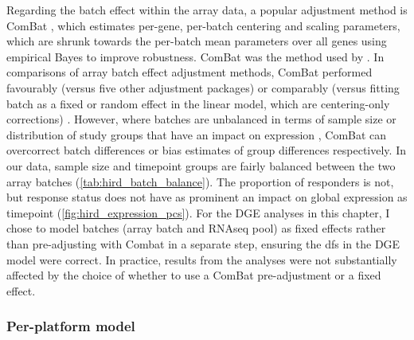 Regarding the batch effect within the array data, a popular adjustment method is ComBat \autocite{johnson2007AdjustingBatchEffects}, which estimates per-gene, per-batch centering and scaling parameters, which are shrunk towards the per-batch mean parameters over all genes using empirical Bayes to improve robustness.
ComBat was the method used by \textcite{sobolev2016AdjuvantedInfluenzaH1N1Vaccination}.
In comparisons of array batch effect adjustment methods, ComBat performed favourably (versus five other adjustment packages) \autocite{chen2011RemovingBatchEffects} or comparably (versus fitting batch as a fixed or random effect in the linear model, which are centering-only corrections) \autocite{espin-perez2018ComparisonStatisticalMethods}.
However, where batches are unbalanced in terms of sample size \autocite{zhang2018AlternativeEmpiricalBayes} or distribution of study groups that have an impact on expression \autocite{nygaard2015MethodsThatRemove}, ComBat can overcorrect batch differences or bias estimates of group differences respectively.
In our data, sample size and timepoint groups are fairly balanced between the two array batches (\cref{tab:hird_batch_balance}).
The proportion of responders is not, but response status does not have as prominent an impact on global expression as timepoint (\cref{fig:hird_expression_pcs}).
For the \gls{DGE} analyses in this chapter, I chose to model batches (array batch and \gls{RNAseq} pool) as fixed effects rather than pre-adjusting with Combat in a separate step, ensuring the \glspl{df} in the \gls{DGE} model were correct.
In practice, results from the analyses were not substantially affected by the choice of whether to use a ComBat pre-adjustment or a fixed effect.
%



\subsubsection{Per-platform  model}
\label{subsubsec:hird_dge_per_platform_dge_model}

